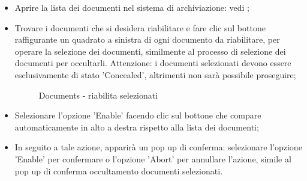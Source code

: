 \documentclass[10pt, a4paper]{article}
\begin{document}
\begin{itemize}
    \item Aprire la lista dei documenti nel sistema di archiviazione: vedi ;
    \item Trovare i documenti che si desidera riabilitare e fare clic sul bottone raffigurante un quadrato a sinistra di ogni documento da riabilitare, per operare la selezione dei documenti, similmente al processo di selezione dei documenti per occultarli. Attenzione: i documenti selezionati devono essere esclusivamente di stato 'Concealed', altrimenti non sarà possibile proseguire;
    \begin{figure}[H]
        \centering  
        \caption{Documents - riabilita selezionati}
        \label{img:enableSel}
    \end{figure}
    \item Selezionare l'opzione 'Enable' facendo clic sul bottone che compare automaticamente in alto a destra rispetto alla lista dei documenti; 
    \item In seguito a tale azione, apparirà un pop up di conferma: selezionare l'opzione 'Enable' per confermare o l'opzione 'Abort' per annullare l'azione, simile al pop up di conferma occultamento documenti selezionati.
\end{itemize}
\end{document}
